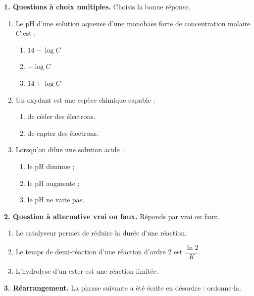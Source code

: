 \documentclass[11pt]{article}
\begin{document}



\noindent\textbf{1. Questions à choix multiples.} Choisis la bonne réponse.
\begin{enumerate}[label=\alph*.]
  \item Le pH d'une solution aqueuse d'une monobase forte de concentration molaire $C$ est :
  \begin{enumerate}[label=a\textsubscript{\arabic*})]
    \item $14 - \log C$
    \item $-\log C$
    \item $14 + \log C$
  \end{enumerate}
  \item Un oxydant est une espèce chimique capable :
  \begin{enumerate}[label=b\textsubscript{\arabic*})]
    \item de céder des électrons.
    \item de capter des électrons.
  \end{enumerate}
  \item Lorsqu'on dilue une solution acide :
  \begin{enumerate}[label=c\textsubscript{\arabic*})]
    \item le pH diminue ;
    \item le pH augmente ;
    \item le pH ne varie pas.
  \end{enumerate}
\end{enumerate}

\medskip
\noindent\textbf{2. Question à alternative vrai ou faux.} Réponds par vrai ou faux.
\begin{enumerate}[label=\alph*.]
  \item Le catalyseur permet de réduire la durée d'une réaction.
  \item Le temps de demi-réaction d'une réaction d'ordre 2 est $\dfrac{\ln 2}{K}$.
  \item L'hydrolyse d'un ester est une réaction limitée.
\end{enumerate}

\medskip
\noindent\textbf{3. Réarrangement.} La phrase suivante a été écrite en désordre : ordonne-la.
\end{document}
